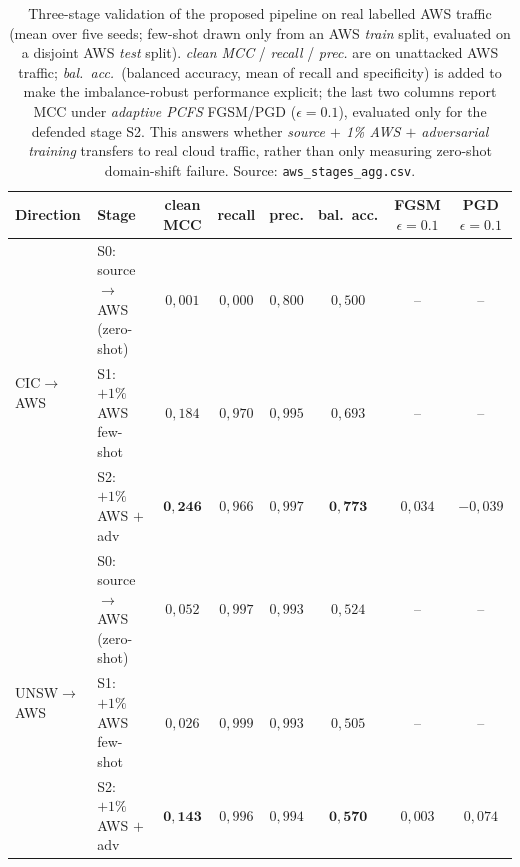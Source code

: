 \documentclass[11pt,a4paper]{article}
\begin{document}
\begin{table}[h]
\centering
\caption{Three-stage validation of the proposed pipeline on real labelled AWS traffic
(mean over five seeds; few-shot drawn only from an AWS \emph{train} split, evaluated
on a disjoint AWS \emph{test} split). \emph{clean MCC} / \emph{recall} / \emph{prec.}
are on unattacked AWS traffic; \emph{bal.\ acc.}\ (balanced accuracy, mean of recall and specificity) is added to make the imbalance-robust performance explicit; the last two columns report MCC under \emph{adaptive
PCFS} FGSM/PGD ($\epsilon{=}0.1$), evaluated only for the defended stage S2. This
answers whether \emph{source $+$ 1\% AWS $+$ adversarial training} transfers to real
cloud traffic, rather than only measuring zero-shot domain-shift failure. Source:
\texttt{aws\_stages\_agg.csv}.}
\label{tab:aws_stages}
\small
\begin{tabular}{llcccccc}
\toprule
Direction & Stage & clean MCC & recall & prec. & bal.\ acc. & FGSM $\epsilon{=}0.1$ & PGD $\epsilon{=}0.1$ \\
\midrule
\multirow{3}{*}{CIC$\rightarrow$AWS}
 & S0: source$\rightarrow$AWS (zero-shot) & $0{,}001$ & $0{,}000$ & $0{,}800$ & $0{,}500$ & -- & -- \\
 & S1: $+1\%$ AWS few-shot                & $0{,}184$ & $0{,}970$ & $0{,}995$ & $0{,}693$ & -- & -- \\
 & S2: $+1\%$ AWS $+$ adv                 & $\mathbf{0{,}246}$ & $0{,}966$ & $0{,}997$ & $\mathbf{0{,}773}$ & $0{,}034$ & $-0{,}039$ \\
\midrule
\multirow{3}{*}{UNSW$\rightarrow$AWS}
 & S0: source$\rightarrow$AWS (zero-shot) & $0{,}052$ & $0{,}997$ & $0{,}993$ & $0{,}524$ & -- & -- \\
 & S1: $+1\%$ AWS few-shot                & $0{,}026$ & $0{,}999$ & $0{,}993$ & $0{,}505$ & -- & -- \\
 & S2: $+1\%$ AWS $+$ adv                 & $\mathbf{0{,}143}$ & $0{,}996$ & $0{,}994$ & $\mathbf{0{,}570}$ & $0{,}003$ & $0{,}074$ \\
\bottomrule
\end{tabular}
\end{table}
\end{document}
